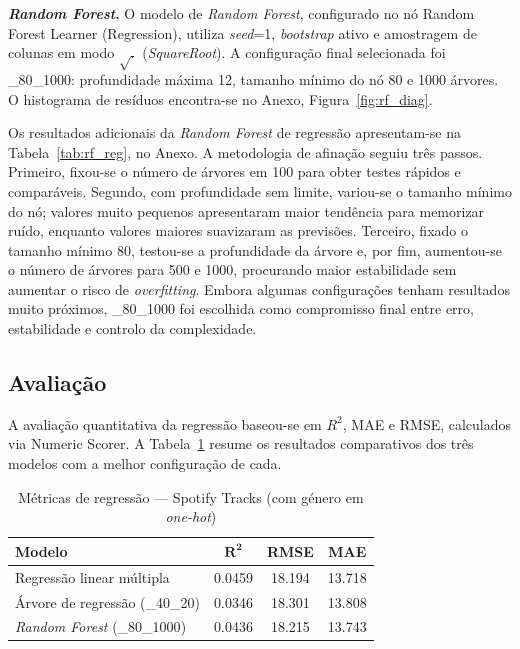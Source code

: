 \documentclass[11pt,a4paper]{article}
\newcommand{\code}[1]{{\ttfamily\hyphenchar\font=45\relax #1}}
\begin{document}
\textbf{\textit{Random Forest}.}
O modelo de \textit{Random Forest}, configurado no nó \code{Random Forest Learner (Regression)}, utiliza \textit{seed}=1, \textit{bootstrap} ativo e amostragem de colunas em modo $\sqrt{.}$ (\textit{SquareRoot}). A configuração final selecionada foi \code{12\_80\_1000}: profundidade máxima 12, tamanho mínimo do nó 80 e 1000 árvores. O histograma de resíduos encontra-se no Anexo, Figura~\ref{fig:rf_diag}.

Os resultados adicionais da \textit{Random Forest} de regressão apresentam-se na Tabela~\ref{tab:rf_reg}, no Anexo. A metodologia de afinação seguiu três passos. Primeiro, fixou-se o número de árvores em 100 para obter testes rápidos e comparáveis. Segundo, com profundidade sem limite, variou-se o tamanho mínimo do nó; valores muito pequenos apresentaram maior tendência para memorizar ruído, enquanto valores maiores suavizaram as previsões. Terceiro, fixado o tamanho mínimo 80, testou-se a profundidade da árvore e, por fim, aumentou-se o número de árvores para 500 e 1000, procurando maior estabilidade sem aumentar o risco de \textit{overfitting}. Embora algumas configurações tenham resultados muito próximos, \code{12\_80\_1000} foi escolhida como compromisso final entre erro, estabilidade e controlo da complexidade.

\subsection{Avaliação}

A avaliação quantitativa da regressão baseou-se em $R^2$, MAE e RMSE, calculados via \code{Numeric Scorer}. A Tabela~\ref{tab:metricas_spotify} resume os resultados comparativos dos três modelos com a melhor configuração de cada.

\begin{table}[H]
\centering
\caption{Métricas de regressão --- Spotify Tracks (com género em \textit{one-hot})}
\label{tab:metricas_spotify}
\begin{tabular}{lccc}
\toprule
\textbf{Modelo} & $\mathbf{R^2}$ & \textbf{RMSE} & \textbf{MAE}\\
\midrule
Regressão linear múltipla & 0.0459 & 18.194 & 13.718\\
Árvore de regressão (\code{5\_40\_20}) & 0.0346 & 18.301 & 13.808\\
\textit{Random Forest} (\code{12\_80\_1000}) & 0.0436 & 18.215 & 13.743\\
\bottomrule
\end{tabular}
\end{table}
\end{document}
